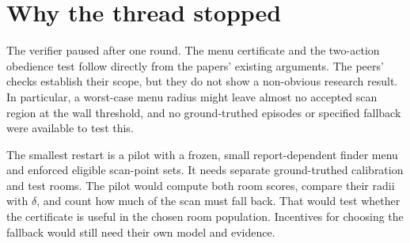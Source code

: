 \documentclass{article}
\begin{document}
\section{Why the thread stopped}

The verifier paused after one round. The menu certificate and the two-action obedience test follow
directly from the papers' existing arguments. The peers' checks establish their scope, but they do
not show a non-obvious research result. In particular, a worst-case menu radius might leave almost
no accepted scan region at the wall threshold, and no ground-truthed episodes or specified fallback
were available to test this.

The smallest restart is a pilot with a frozen, small report-dependent finder menu and enforced
eligible scan-point sets. It needs separate ground-truthed calibration and test rooms. The pilot
would compute both room scores, compare their radii with \(\delta\), and count how much of the scan
must fall back. That would test whether the certificate is useful in the chosen room population.
Incentives for choosing the fallback would still need their own model and evidence.



\end{document}
